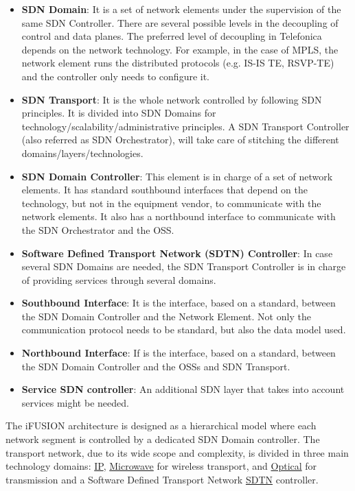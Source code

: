 \documentclass[a4paper,fleqn]{cas-dc}
\begin{document}
\begin{itemize}
\item \textbf{SDN Domain}: It is a set of network elements under the supervision of the same SDN Controller. There are several possible levels in the decoupling of control and data planes. The preferred level of decoupling in Telefonica depends on the network technology. For example, in the case of MPLS, the network element runs the distributed protocols (e.g. IS-IS TE, RSVP-TE) and the controller only needs to configure it.

\item \textbf{SDN Transport}: It is the whole network controlled by following SDN principles. It is divided into SDN Domains for technology/scalability/administrative principles. A SDN Transport Controller (also referred as SDN Orchestrator), will take care of stitching the different domains/layers/technologies.

\item \textbf{SDN Domain Controller}: This element is in charge of a set of network elements. It has standard southbound interfaces that depend on the technology, but not in the equipment vendor, to communicate with the network elements. It also has a northbound interface to communicate with the SDN Orchestrator and the OSS.

\item \textbf{Software Defined Transport Network (SDTN) Controller}: In case several SDN Domains are needed, the SDN Transport Controller is in charge of providing services through several domains. 

\item \textbf{Southbound Interface}: It is the interface, based on a standard, between the SDN Domain Controller and the Network Element. Not only the communication protocol needs to be standard, but also the data model used.

\item \textbf{Northbound Interface}: If is the interface, based on a standard, between the SDN Domain Controller and the OSSs and SDN Transport.

\item \textbf{Service SDN controller}: An additional SDN layer that takes into account services might be needed. 
\end{itemize}

The iFUSION architecture is designed as a hierarchical model where each network segment is controlled by a dedicated SDN Domain controller. The transport network, due to its wide scope and complexity, is divided in three main technology domains: \hyperref[section:ip]{IP}, \hyperref[section:mw]{Microwave} for wireless transport, and \hyperref[section:dwdm]{Optical} for transmission and a Software Defined Transport Network \hyperref[section:sdtn]{SDTN} controller.
\end{document}
